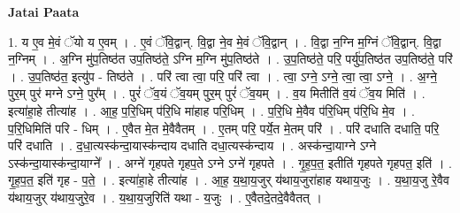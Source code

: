 \documentclass[17pt]{extarticle}
\begin{document}
\textbf{Jatai Paata} \newline

1. य ए॒व मे॒वं ॅयो य ए॒वम् । . ए॒वं ॅवि॒द्वान्. वि॒द्वा ने॒व मे॒वं ॅवि॒द्वान् । . वि॒द्वा न॒ग्नि म॒ग्निं ॅवि॒द्वान्. वि॒द्वा न॒ग्निम् । . अ॒ग्नि मु॑प॒तिष्ठ॑त उप॒तिष्ठ॑ते॒ ऽग्नि म॒ग्नि मु॑प॒तिष्ठ॑ते । . उ॒प॒तिष्ठ॑ते॒ परि॒ पर्यु॑प॒तिष्ठ॑त उप॒तिष्ठ॑ते॒ परि॑ । . उ॒प॒तिष्ठ॑त॒ इत्यु॑प - तिष्ठ॑ते । . परि॑ त्वा त्वा॒ परि॒ परि॑ त्वा । . त्वा॒ ऽग्ने॒ ऽग्ने॒ त्वा॒ त्वा॒ ऽग्ने॒ । . अ॒ग्ने॒ पुर॒म् पुर॑ मग्ने ऽग्ने॒ पुर᳚म् । . पुरं॑ ॅव॒यं ॅव॒यम् पुर॒म् पुरं॑ ॅव॒यम् । . व॒य मितीति॑ व॒यं ॅव॒य मिति॑ । . इत्या॑हा॒हे तीत्या॑ह । . आ॒ह॒ प॒रि॒धिम् प॑रि॒धि मा॑हाह परि॒धिम् । . प॒रि॒धि मे॒वैव प॑रि॒धिम् प॑रि॒धि मे॒व । . प॒रि॒धिमिति॑ परि - धिम् । . ए॒वैत मे॒त मे॒वैवैतम् । . ए॒तम् परि॒ पर्ये॒त मे॒तम् परि॑ । . परि॑ दधाति दधाति॒ परि॒ परि॑ दधाति । . द॒धा॒त्यस्क॑न्दा॒यास्क॑न्दाय दधाति दधा॒त्यस्क॑न्दाय । . अस्क॑न्दा॒याग्ने ऽग्ने ऽस्क॑न्दा॒यास्क॑न्दा॒याग्ने᳚ । . अग्ने॑ गृहपते गृहप॒ते ऽग्ने ऽग्ने॑ गृहपते । . गृ॒ह॒प॒त॒ इतीति॑ गृहपते गृहपत॒ इति॑ । . गृ॒ह॒प॒त॒ इति॑ गृह - प॒ते॒ । . इत्या॑हा॒हे तीत्या॑ह । . आ॒ह॒ य॒था॒य॒जुर् य॑थाय॒जुरा॑हाह यथाय॒जुः । . य॒था॒य॒जु रे॒वैव य॑थाय॒जुर् य॑थाय॒जुरे॒व । . य॒था॒य॒जुरिति॑ यथा - य॒जुः । . ए॒वैतदे॒तदे॒वैवैतत् । \newline
\end{document}
